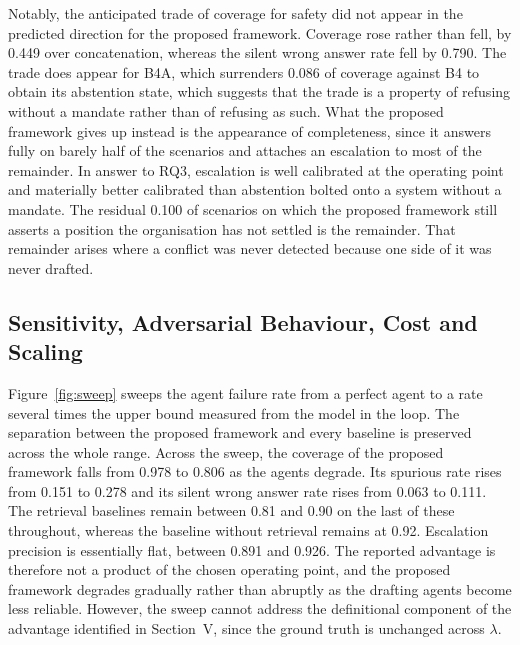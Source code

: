 \documentclass[journal]{IEEEtran}
\begin{document}
Notably, the anticipated trade of coverage for safety did not appear in the predicted direction for the proposed framework. Coverage rose rather than fell, by 0.449 over concatenation, whereas the silent wrong answer rate fell by 0.790. The trade does appear for B4A, which surrenders 0.086 of coverage against B4 to obtain its abstention state, which suggests that the trade is a property of refusing without a mandate rather than of refusing as such. What the proposed framework gives up instead is the appearance of completeness, since it answers fully on barely half of the scenarios and attaches an escalation to most of the remainder. In answer to RQ3, escalation is well calibrated at the operating point and materially better calibrated than abstention bolted onto a system without a mandate. The residual 0.100 of scenarios on which the proposed framework still asserts a position the organisation has not settled is the remainder. That remainder arises where a conflict was never detected because one side of it was never drafted.

\subsection{Sensitivity, Adversarial Behaviour, Cost and Scaling}

Figure~\ref{fig:sweep} sweeps the agent failure rate from a perfect agent to a rate several times the upper bound measured from the model in the loop. The separation between the proposed framework and every baseline is preserved across the whole range. Across the sweep, the coverage of the proposed framework falls from 0.978 to 0.806 as the agents degrade. Its spurious rate rises from 0.151 to 0.278 and its silent wrong answer rate rises from 0.063 to 0.111. The retrieval baselines remain between 0.81 and 0.90 on the last of these throughout, whereas the baseline without retrieval remains at 0.92. Escalation precision is essentially flat, between 0.891 and 0.926. The reported advantage is therefore not a product of the chosen operating point, and the proposed framework degrades gradually rather than abruptly as the drafting agents become less reliable. However, the sweep cannot address the definitional component of the advantage identified in Section~V, since the ground truth is unchanged across $\lambda$.
\end{document}
